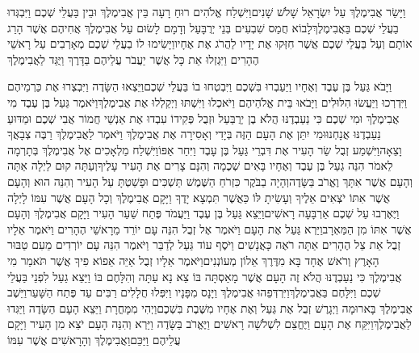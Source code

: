 \documentclass[../main/main.tex]{subfiles}
\begin{document}
\begin{multicols*}{\ncols}
וַיָּשַׂר אֲבִימֶלֶךְ עַל יִשְׂרָאֵל שָׁלֹשׁ שָׁנִים\PreVerseSpace{}וַיִּשְׁלַח אֱלֹהִים רוּחַ רָעָה בֵּין אֲבִימֶלֶךְ וּבֵין בַּעֲלֵי שְׁכֶם וַיִּבְגְּדוּ בַעֲלֵי שְׁכֶם בַּאֲבִימֶלֶךְ\PreVerseSpace{}לָבוֹא חֲמַס שִׁבְעִים בְּנֵי יְרֻבָּעַל וְדָמָם לָשׂוּם עַל אֲבִימֶלֶךְ אֲחִיהֶם אֲשֶׁר הָרַג אוֹתָם וְעַל בַּעֲלֵי שְׁכֶם אֲשֶׁר חִזְּקוּ אֶת יָדָיו לַהֲרֹג אֶת אֶחָיו\PreVerseSpace{}וַיָּשִׂימוּ לוֹ בַעֲלֵי שְׁכֶם מְאָרְבִים עַל רָאשֵׁי הֶהָרִים וַיִּגְזְלוּ אֵת כָּל אֲשֶׁר יַעֲבֹר עֲלֵיהֶם בַּדָּרֶךְ וַיֻּגַּד לַאֲבִימֶלֶךְ\OpenSection{}\par
{}וַיָּבֹא גַּעַל בֶּן עֶבֶד וְאֶחָיו וַיַּעַבְרוּ בִּשְׁכֶם וַיִּבְטְחוּ בוֹ בַּעֲלֵי שְׁכֶם\PreVerseSpace{}וַיֵּצְאוּ הַשָּׂדֶה וַיִּבְצְרוּ אֶת כַּרְמֵיהֶם וַיִּדְרְכוּ וַיַּעֲשׂוּ הִלּוּלִים וַיָּבֹאוּ בֵּית אֱלֹהֵיהֶם וַיֹּאכְלוּ וַיִּשְׁתּוּ וַיְקַלְלוּ אֶת אֲבִימֶלֶךְ\PreVerseSpace{}וַיֹּאמֶר גַּעַל בֶּן עֶבֶד מִי אֲבִימֶלֶךְ וּמִי שְׁכֶם כִּי נַעַבְדֶנּוּ הֲלֹא בֶן יְרֻבַּעַל וּזְבֻל פְּקִידוֹ עִבְדוּ אֶת אַנְשֵׁי חֲמוֹר אֲבִי שְׁכֶם וּמַדּוּעַ נַעַבְדֶנּוּ אֲנָחְנוּ\PreVerseSpace{}וּמִי יִתֵּן אֶת הָעָם הַזֶּה בְּיָדִי וְאָסִירָה אֶת אֲבִימֶלֶךְ וַיֹּאמֶר לַאֲבִימֶלֶךְ רַבֶּה צְבָאֲךָ וָצֵאָה\PreVerseSpace{}וַיִּשְׁמַע זְבֻל שַׂר הָעִיר אֶת דִּבְרֵי גַּעַל בֶּן עָבֶד וַיִּחַר אַפּוֹ\PreVerseSpace{}וַיִּשְׁלַח מַלְאָכִים אֶל אֲבִימֶלֶךְ בְּתָרְמָה לֵאמֹר הִנֵּה גַעַל בֶּן עֶבֶד וְאֶחָיו בָּאִים שְׁכֶמָה וְהִנָּם צָרִים אֶת הָעִיר עָלֶיךָ\PreVerseSpace{}וְעַתָּה קוּם לַיְלָה אַתָּה וְהָעָם אֲשֶׁר אִתָּךְ וֶאֱרֹב בַּשָּׂדֶה\PreVerseSpace{}וְהָיָה בַבֹּקֶר כִּזְרֹחַ הַשֶּׁמֶשׁ תַּשְׁכִּים וּפָשַׁטְתָּ עַל הָעִיר וְהִנֵּה הוּא וְהָעָם אֲשֶׁר אִתּוֹ יֹצְאִים אֵלֶיךָ וְעָשִׂיתָ לּוֹ כַּאֲשֶׁר תִּמְצָא יָדֶךָ \ClosedSection{}וַיָּקָם אֲבִימֶלֶךְ וְכָל הָעָם אֲשֶׁר עִמּוֹ לָיְלָה וַיֶּאֶרְבוּ עַל שְׁכֶם אַרְבָּעָה רָאשִׁים\PreVerseSpace{}וַיֵּצֵא גַּעַל בֶּן עֶבֶד וַיַּעֲמֹד פֶּתַח שַׁעַר הָעִיר וַיָּקָם אֲבִימֶלֶךְ וְהָעָם אֲשֶׁר אִתּוֹ מִן הַמַּאְרָב\PreVerseSpace{}וַיַּרְא גַּעַל אֶת הָעָם וַיֹּאמֶר אֶל זְבֻל הִנֵּה עָם יוֹרֵד מֵרָאשֵׁי הֶהָרִים וַיֹּאמֶר אֵלָיו זְבֻל אֵת צֵל הֶהָרִים אַתָּה רֹאֶה כָּאֲנָשִׁים \ClosedSection{}וַיֹּסֶף עוֹד גַּעַל לְדַבֵּר וַיֹּאמֶר הִנֵּה עָם יוֹרְדִים מֵעִם טַבּוּר הָאָרֶץ וְרֹאשׁ אֶחָד בָּא מִדֶּרֶךְ אֵלוֹן מְעוֹנְנִים\PreVerseSpace{}וַיֹּאמֶר אֵלָיו זְבֻל אַיֵּה אֵפוֹא פִיךָ אֲשֶׁר תֹּאמַר מִי אֲבִימֶלֶךְ כִּי נַעַבְדֶנּוּ הֲלֹא זֶה הָעָם אֲשֶׁר מָאַסְתָּה בּוֹ צֵא נָא עַתָּה וְהִלָּחֶם בּוֹ \ClosedSection{}וַיֵּצֵא גַעַל לִפְנֵי בַּעֲלֵי שְׁכֶם וַיִּלָּחֶם בַּאֲבִימֶלֶךְ\PreVerseSpace{}וַיִּרְדְּפֵהוּ אֲבִימֶלֶךְ וַיָּנָס מִפָּנָיו וַיִּפְּלוּ חֲלָלִים רַבִּים עַד פֶּתַח הַשָּׁעַר\PreVerseSpace{}וַיֵּשֶׁב אֲבִימֶלֶךְ בָּארוּמָה וַיְגָרֶשׁ זְבֻל אֶת גַּעַל וְאֶת אֶחָיו מִשֶּׁבֶת בִּשְׁכֶם\PreVerseSpace{}וַיְהִי מִמָּחֳרָת וַיֵּצֵא הָעָם הַשָּׂדֶה וַיַּגִּדוּ לַאֲבִימֶלֶךְ\PreVerseSpace{}וַיִּקַּח אֶת הָעָם וַיֶּחֱצֵם לִשְׁלֹשָׁה רָאשִׁים וַיֶּאֱרֹב בַּשָּׂדֶה וַיַּרְא וְהִנֵּה הָעָם יֹצֵא מִן הָעִיר וַיָּקָם עֲלֵיהֶם וַיַּכֵּם\PreVerseSpace{}וַאֲבִימֶלֶךְ וְהָרָאשִׁים אֲשֶׁר עִמּוֹ 
\end{multicols*}
\end{document}
